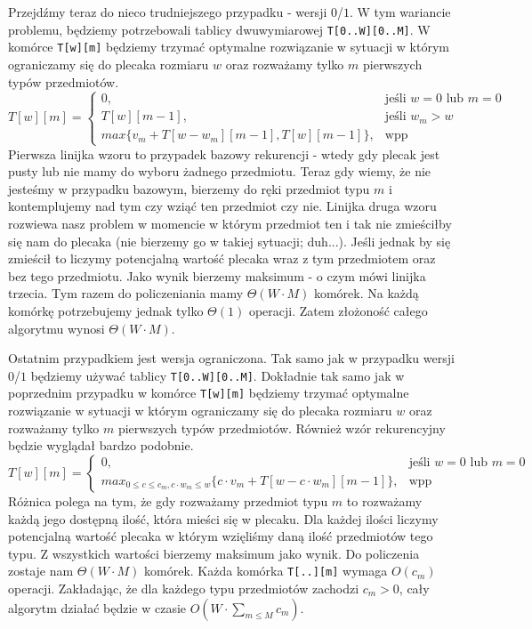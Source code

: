 Przejdźmy teraz do nieco trudniejszego przypadku - wersji $0$/$1$.
W tym wariancie problemu, będziemy potrzebowali tablicy dwuwymiarowej \texttt{T[0..W][0..M]}.
W komórce \texttt{T[w][m]} będziemy trzymać optymalne rozwiązanie w sytuacji w którym ograniczamy się do plecaka rozmiaru $w$ oraz rozważamy tylko $m$ pierwszych typów przedmiotów.
\begin{equation*}
  T[w][m] = \begin{cases}
    0, & \text{jeśli $w = 0$ lub $m = 0$}\\
    T[w][m-1], & \text{jeśli $w_m > w$}\\
    max\{v_m + T[w - w_m][m-1], T[w][m-1]\}, & \text{wpp}
  \end{cases}
\end{equation*}
Pierwsza linijka wzoru to przypadek bazowy rekurencji - wtedy gdy plecak jest pusty lub nie mamy do wyboru żadnego przedmiotu.
Teraz gdy wiemy, że nie jesteśmy w przypadku bazowym, bierzemy do ręki przedmiot typu $m$ i kontemplujemy nad tym czy wziąć ten przedmiot czy nie.
Linijka druga wzoru rozwiewa nasz problem w momencie w którym przedmiot ten i tak nie zmieściłby się nam do plecaka (nie bierzemy go w takiej sytuacji; duh...).
Jeśli jednak by się zmieścił to liczymy potencjalną wartość plecaka wraz z tym przedmiotem oraz bez tego przedmiotu.
Jako wynik bierzemy maksimum - o czym mówi linijka trzecia.
Tym razem do policzeniania mamy $\Theta(W \cdot M)$ komórek.
Na każdą komórkę potrzebujemy jednak tylko $\Theta(1)$ operacji.
Zatem złożoność całego algorytmu wynosi $\Theta(W \cdot M)$.

Ostatnim przypadkiem jest wersja ograniczona.
Tak samo jak w przypadku wersji $0$/$1$ będziemy używać tablicy \texttt{T[0..W][0..M]}.
Dokładnie tak samo jak w poprzednim przypadku w komórce \texttt{T[w][m]} będziemy trzymać optymalne rozwiązanie
w sytuacji w którym ograniczamy się do plecaka rozmiaru $w$ oraz rozważamy tylko $m$ pierwszych typów przedmiotów.
Również wzór rekurencyjny będzie wyglądał bardzo podobnie.
\begin{equation*}
  T[w][m] = \begin{cases}
    0, & \text{jeśli $w = 0$ lub $m = 0$}\\
    max_{0 \leq c \leq c_m, c \cdot w_m \leq w}\{c \cdot v_m + T[w - c \cdot w_m][m-1]\}, & \text{wpp}
  \end{cases}
\end{equation*}
Różnica polega na tym, że gdy rozważamy przedmiot typu $m$ to rozważamy każdą jego dostępną ilość, która mieści się w plecaku.
Dla każdej ilości liczymy potencjalną wartość plecaka w którym wzięliśmy daną ilość przedmiotów tego typu.
Z wszystkich wartości bierzemy maksimum jako wynik.
Do policzenia zostaje nam $\Theta(W \cdot M)$ komórek.
Każda komórka \texttt{T[..][m]} wymaga $O(c_m)$ operacji.
Zakładając, że dla każdego typu przedmiotów zachodzi $c_m > 0$, cały algorytm działać będzie w czasie $O(W \cdot \sum_{m \leq M} c_m)$.

